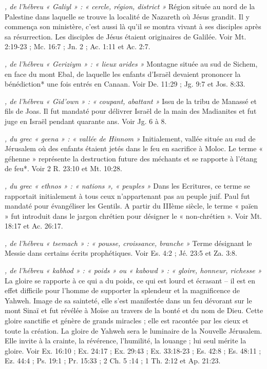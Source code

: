 \begin{multicols}{2}
\textit{, de l'hébreu « Galiyl » : « cercle, région, district »}\newline
Région située au nord de la Palestine dans laquelle se trouve la localité de Nazareth où Jésus grandit. Il y commença son ministère, c'est aussi là qu'il se montra vivant à ses disciples après sa résurrection. Les disciples de Jésus étaient originaires de Galilée. Voir Mt. 2:19-23 ; Mc. 16:7 ; Jn. 2 ; Ac. 1:11 et Ac. 2:7.

\textit{, de l'hébreu « Geriziym » : « lieux arides »}\newline
Montagne située au sud de Sichem, en face du mont Ebal, de laquelle les enfants d'Israël devaient prononcer la bénédiction* une fois entrés en Canaan. Voir De. 11:29 ; Jg. 9:7 et Jos. 8:33.

\textit{, de l'hébreu « Gid'own » : « coupant, abattant »}\newline
Issu de la tribu de Manassé et fils de Joas. Il fut mandaté pour délivrer Israël de la main des Madianites et fut juge en Israël pendant quarante ans. Voir Jg. 6 à 8.

\textit{, du grec « geena » : « vallée de Hinnom »}\newline
Initialement, vallée située au sud de Jérusalem où des enfants étaient jetés dans le feu en sacrifice à Moloc. Le terme « géhenne » représente la destruction future des méchants et se rapporte à l'étang de feu*. Voir 2 R. 23:10 et Mt. 10:28.

\textit{, du grec « ethnos » : « nations », « peuples »}\newline
Dans les Ecritures, ce terme se rapportait initialement à tous ceux n'appartenant pas au peuple juif. Paul fut mandaté pour évangéliser les Gentils. A partir du IIIème siècle, le terme « païen » fut introduit dans le jargon chrétien pour désigner le « non-chrétien ». Voir Mt. 18:17 et Ac. 26:17.

\textit{, de l'hébreu « tsemach » : « pousse, croissance, branche »}\newline
Terme désignant le Messie dans certains écrits prophétiques. Voir Es. 4:2 ; Jé. 23:5 et Za. 3:8.

\textit{, de l'hébreu « kabhod » : « poids » ou « kabowd » : « gloire, honneur, richesse »}\newline
La gloire se rapporte à ce qui a du poids, ce qui est lourd et écrasant – il est en effet difficile pour l'homme de supporter la splendeur et la magnificence de Yahweh. Image de sa sainteté, elle s'est manifestée dans un feu dévorant sur le mont Sinaï et fut révélée à Moïse au travers de la bonté et du nom de Dieu. Cette gloire sanctifie et génère de grands miracles ; elle est racontée par les cieux et toute la création. La gloire de Yahweh sera le luminaire de la Nouvelle Jérusalem. Elle invite à la crainte, la révérence, l'humilité, la louange ; lui seul mérite la gloire. Voir Ex. 16:10 ; Ex. 24:17 ; Ex. 29:43 ; Ex. 33:18-23 ; Es. 42:8 ; Es. 48:11 ; Ez. 44:4 ; Ps. 19:1 ; Pr. 15:33 ; 2 Ch. 5 :14 ; 1 Th. 2:12 et Ap. 21:23.


\end{multicols}
